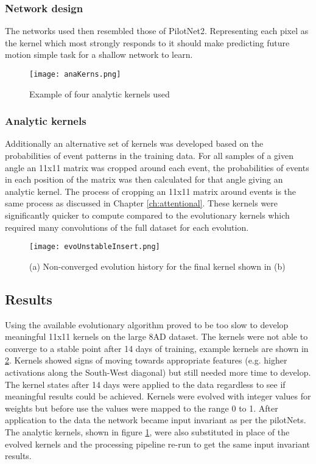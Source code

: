 \subsubsection{Network design} 
The networks used then resembled those of PilotNet2.
Representing each pixel as the kernel which most strongly responds to it should make predicting future motion simple task for a shallow network to learn.

\begin{figure}
    \centering
    \texttt{[image: anaKerns.png]}
    \caption{Example of four analytic kernels used}
    \label{fig:anaKerns}
\end{figure}

\subsubsection{Analytic kernels}
Additionally an alternative set of kernels was developed based on the probabilities of event patterns in the training data.
For all samples of a given angle an 11x11 matrix was cropped around each event, the probabilities of events in each position of the matrix was then calculated for that angle giving an analytic kernel.
The process of cropping an 11x11 matrix around events is the same process as discussed in Chapter \ref{ch:attentional}.
These kernels were significantly quicker to compute compared to the evolutionary kernels which required many convolutions of the full dataset for each evolution. 


\begin{figure}[h]
    \centering
    \texttt{[image: evoUnstableInsert.png]}
    \caption{(a) Non-converged evolution history for the final kernel shown in (b)}
    \label{fig:evoUnstableInsert}
\end{figure}

\subsection{Results}
Using the available evolutionary algorithm proved to be too slow to develop meaningful 11x11 kernels on the large 8AD dataset.
The kernels were not able to converge to a stable point after 14 days of training, example kernels are shown in \ref{fig:evoUnstableInsert}.
Kernels showed signs of moving towards appropriate features (e.g. higher activations along the South-West diagonal) but still needed more time to develop. 
The kernel states after 14 days were applied to the data regardless to see if meaningful results could be achieved. 
Kernels were evolved with integer values for weights but before use the values were mapped to the range 0 to 1.
After application to the data the network became input invariant as per the pilotNets. 
The analytic kernels, shown in figure \ref{fig:anaKerns}, were also substituted in place of the evolved kernels and the processing pipeline re-run to get the same input invariant results. 


